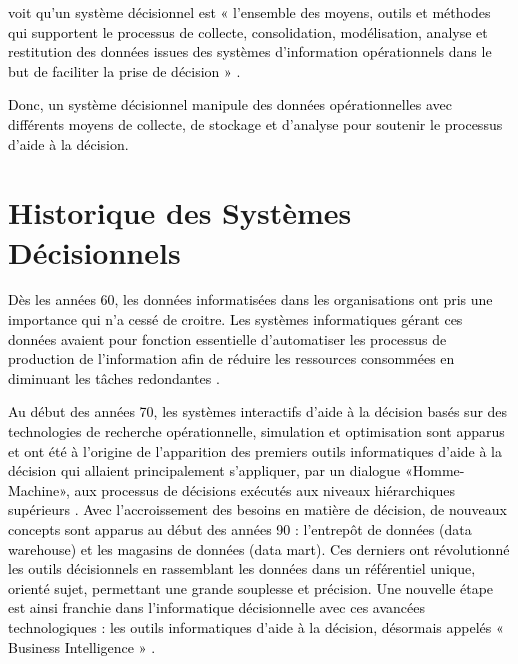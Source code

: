 \documentclass[a4paper,12pt]{report}
\begin{document}
\textcolor{black}{\citep{lau09place} voit qu’un système décisionnel est « l’ensemble des moyens, outils et méthodes qui supportent le processus de collecte, consolidation, modélisation, analyse et restitution des  données issues des systèmes d’information opérationnels dans le but de faciliter la prise de décision » \citep{lau09place}.}

\textcolor{black}{Donc, un système décisionnel manipule des données opérationnelles avec différents moyens de collecte, de stockage et d’analyse pour soutenir le processus d’aide à la décision.
	}
\section{Historique des Systèmes Décisionnels}
\textcolor{black}{Dès les années 60, les données informatisées dans les organisations ont pris une importance qui n’a cessé de croitre. Les systèmes informatiques gérant ces données avaient pour fonction essentielle d’automatiser les processus de production de l’information afin de réduire les ressources consommées en diminuant les tâches redondantes \citep{teste2009modelisation}.}

\textcolor{black}{Au début des années 70, les systèmes interactifs d'aide à la décision basés sur des technologies de recherche opérationnelle, simulation et optimisation sont apparus et ont été à l'origine de l'apparition des premiers outils informatiques d'aide à la décision qui allaient principalement s'appliquer, par un dialogue «Homme-Machine», aux processus de décisions exécutés aux niveaux hiérarchiques supérieurs \citep{haouet2008informatique}. Avec l'accroissement des besoins en matière de décision, de nouveaux concepts sont apparus au début des années 90 : l'entrepôt de données (data  warehouse) et les magasins de données (data mart). Ces derniers ont révolutionné les outils décisionnels en rassemblant les données dans un référentiel unique, orienté sujet, permettant une grande souplesse et précision. Une nouvelle étape est ainsi franchie dans l'informatique décisionnelle avec ces avancées technologiques : les outils informatiques d'aide à la décision, désormais appelés «  Business Intelligence » \citep{doucet2007repenser}.} 
\end{document}
